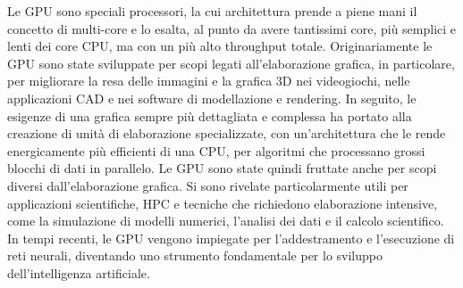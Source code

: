 
Le \gls{GPU} sono speciali processori, la cui architettura prende a piene mani il concetto di multi-core e lo esalta, al punto da avere tantissimi core, più semplici e lenti dei core \gls{CPU}, ma con un più alto throughput totale.
Originariamente le \gls{GPU} sono state sviluppate per scopi legati all'elaborazione grafica, in particolare, per migliorare la resa delle immagini e la grafica 3D nei videogiochi, nelle applicazioni \gls{CAD} e nei software di modellazione e rendering. In seguito, le esigenze di una grafica sempre più dettagliata e complessa ha portato alla creazione di unità di elaborazione specializzate, con un'architettura che le rende energicamente più efficienti di una \gls{CPU}, per algoritmi che processano grossi blocchi di dati in parallelo. Le \gls{GPU} sono state quindi fruttate anche per scopi diversi dall'elaborazione grafica. Si sono rivelate particolarmente utili per applicazioni scientifiche, \gls{HPC} e tecniche che richiedono elaborazione intensive, come la simulazione di modelli numerici, l'analisi dei dati e il calcolo scientifico. In tempi recenti, le \gls{GPU} vengono impiegate per l'addestramento e l'esecuzione di reti neurali, diventando uno strumento fondamentale per lo sviluppo dell'intelligenza artificiale.


